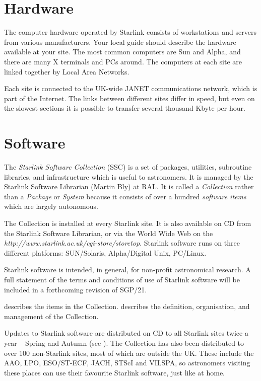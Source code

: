 \documentclass[twoside,11pt,nolof]{starlink}
\begin{document}
\newpage

\section{Hardware}

The computer hardware operated by Starlink consists of workstations and
servers from various manufacturers.
Your local guide should describe the hardware available at your site.
The most common computers are Sun and Alpha, and there are many X terminals
and PCs around.
The computers at each site are linked together by Local Area Networks.

Each site is connected to the UK-wide JANET communications network, which is
part of the Internet.
The links between different sites differ in speed, but even on the slowest
sections it is possible to transfer several thousand Kbyte per hour.

\newpage

\section{Software}

The \emph{Starlink Software Collection}\/ (SSC) is a set of packages, utilities,
subroutine libraries, and infrastructure which is useful to astronomers.
It is managed by the Starlink Software Librarian (Martin Bly) at RAL.
It is called a \emph{Collection}\/ rather than a \emph{Package}\/ or
\emph{System}\/ because it consists of over a hundred \emph{software items}\/
which are largely autonomous.

The Collection is installed at every Starlink site.
It is also available on CD from the Starlink Software Librarian, or via
the World Wide Web on the
\emph{
{http://www.starlink.ac.uk/cgi-store/storetop}}.
Starlink software runs on three different platforms: SUN/Solaris,
Alpha/Digital Unix, PC/Linux.

Starlink software is intended, in general, for non-profit astronomical research.
A full statement of the terms and conditions of use of Starlink software
will be included in a forthcoming revision of SGP/21.

 describes the items in the Collection.
 describes the definition, organisation, and management
of the Collection.

Updates to Starlink software are distributed on CD to all Starlink sites
twice a year -- Spring and Autumn (see ).
The Collection has also been distributed to over 100 non-Starlink sites, most of
which are outside the UK.
These include the AAO, LPO, ESO/ST-ECF, JACH, STScI and VILSPA, so astronomers
visiting these places can use their favourite Starlink software, just like at
home.
\end{document}
